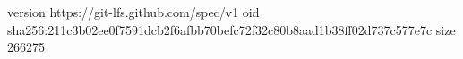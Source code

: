version https://git-lfs.github.com/spec/v1
oid sha256:211c3b02ee0f7591dcb2f6afbb70befc72f32c80b8aad1b38ff02d737c577e7c
size 266275
